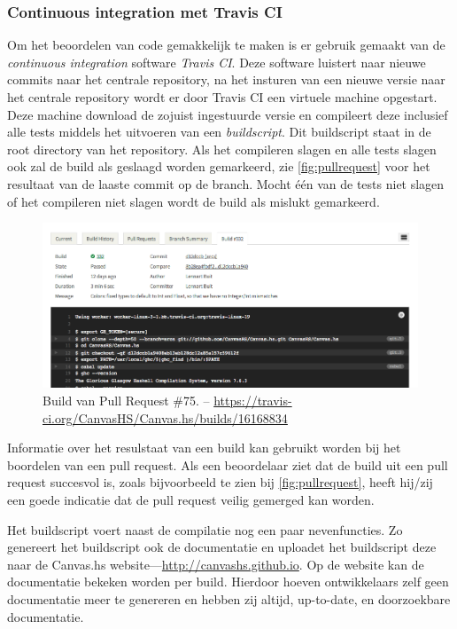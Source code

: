 \subsubsection{Continuous integration met Travis CI}
Om het beoordelen van code gemakkelijk te maken is er gebruik gemaakt van de \emph{continuous integration} software \emph{Travis CI}. Deze software luistert naar nieuwe commits naar het centrale repository, na het insturen van een nieuwe versie naar het centrale repository wordt er door Travis CI een virtuele machine opgestart. Deze machine download de zojuist ingestuurde versie en compileert deze inclusief alle tests middels het uitvoeren van een \emph{buildscript}. Dit buildscript staat in de root directory van het repository. Als het compileren slagen en alle tests slagen ook zal de build als geslaagd worden gemarkeerd, zie \autoref{fig:pullrequest} voor het resultaat van de laaste commit op de  branch. Mocht één van de tests niet slagen of het compileren niet slagen wordt de build als mislukt gemarkeerd.

\begin{figure}[H]
\begin{center}
\includegraphics[keepaspectratio,width=\textwidth]{./images/travis.png}
\caption{Build van Pull Request \#75. – \url{https://travis-ci.org/CanvasHS/Canvas.hs/builds/16168834}}
\label{fig:travis}
\end{center}
\end{figure}

Informatie over het resulstaat van een build kan gebruikt worden bij het boordelen van een pull request. Als een beoordelaar ziet dat de build uit een pull request succesvol is, zoals bijvoorbeeld te zien bij \autoref{fig:pullrequest}, heeft hij/zij een goede indicatie dat de pull request veilig gemerged kan worden.

Het buildscript voert naast de compilatie nog een paar nevenfuncties. Zo genereert het buildscript ook de documentatie en uploadet het buildscript deze naar de Canvas.hs website—\url{http://canvashs.github.io}. Op de website kan de documentatie bekeken worden per build. Hierdoor hoeven ontwikkelaars zelf geen documentatie meer te genereren en hebben zij altijd, up-to-date, en doorzoekbare documentatie.

